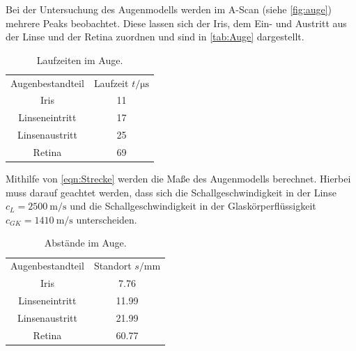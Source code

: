 Bei der Untersuchung des Augenmodells werden im A-Scan (siehe \autoref{fig:auge}) mehrere Peaks beobachtet.
Diese lassen sich der Iris, dem Ein- und Austritt aus der Linse und der Retina zuordnen und sind in \autoref{tab:Auge} dargestellt.
\begin{table}[H]
  \centering
  \caption{Laufzeiten im Auge.}
  \label{tab:Auge}
  \begin{tabular}{c S[table-format=2.0] }
  \toprule
  {Augenbestandteil} & {Laufzeit $t / \si{\micro\second}$} \\
    Iris            &  11 \\
    Linseneintritt  &  17 \\
    Linsenaustritt  &  25 \\
    Retina          &  69 \\

  \bottomrule
  \end{tabular}
\end{table}

Mithilfe von \autoref{eqn:Strecke} werden die Maße des Augenmodells berechnet. Hierbei muss darauf geachtet werden, dass sich
die Schallgeschwindigkeit in der Linse $c_L= \qty{2500}{\meter\per\second}$ und die Schallgeschwindigkeit in der Glaskörperflüssigkeit
$c_{GK}= \qty{1410}{\meter\per\second}$ unterscheiden.

\begin{table}[H]
  \centering
  \caption{Abstände im Auge.}
  \label{tab:Auge}
  \begin{tabular}{c S[table-format=2.2] }
  \toprule
  {Augenbestandteil} & {Standort $s / \si{\milli\meter}$} \\
  Iris            &  7.76\\
  Linseneintritt  &  11.99\\
  Linsenaustritt  &  21.99\\
  Retina          &  60.77\\
  \bottomrule
  \end{tabular}
\end{table}